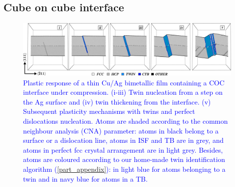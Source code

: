 \documentclass[final,3p,times,twocolumn]{elsarticle}
\begin{document}
 
	\subsection{Cube on cube interface}\label{subsubpart_sAg}

\begin{figure}[!t]
	\begin{center}
		\includegraphics[width=165mm]{Pic/fig_s1AgCOC.eps} 
	\end{center}
	\caption{\textcolor{blue}{Plastic response of a thin Cu/Ag bimetallic film containing a COC interface under compression. (i-iii) Twin nucleation from a step on the Ag surface and (iv) twin thickening from the interface. (v) Subsequent plasticity mechanisms with twins and perfect dislocations nucleation. Atoms are shaded according to the common neighbour analysis (CNA) parameter: atoms in black belong to a surface or a dislocation line, atoms in ISF and TB are in grey, and atoms in perfect fcc crystal arrangement are in light grey. Besides, atoms are coloured according to our home-made twin identification algorithm (\ref{part_appendix}): in light blue for atoms belonging to a twin and in navy blue for atoms in a TB.}}\label{fig_s1AgCOC}
\end{figure}
\end{document}
